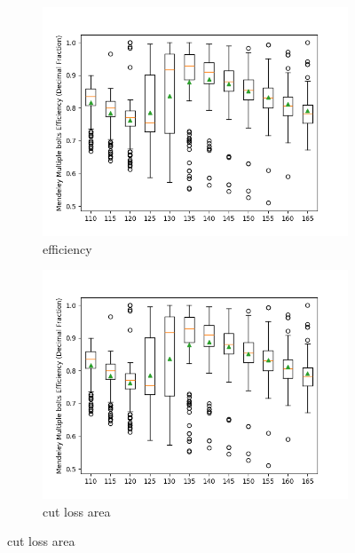 \begin{figure}[H]
    \centering
    \begin{subfigure}[b]{0.45\textwidth}
        \centering
        \includegraphics[width=\textwidth]{Images/Mendeley Multiple bolts Efficiency_Boxplot.png}
        \caption{efficiency}
        \label{fig:multibolt_efficiency}
    \end{subfigure}
    \hfill
    \begin{subfigure}[b]{0.45\textwidth}
        \centering
        \includegraphics[width=\textwidth]{Images/Mendeley Multiple bolts Efficiency_Boxplot.png}
        \caption{cut loss area}
        \label{fig:multibolt_cut_loss_area}
    \end{subfigure}

\end{figure}
